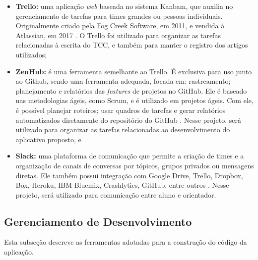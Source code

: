 \begin{itemize}

    \item \textbf{Trello: }uma aplicação \emph{web} baseada no sistema Kanbam, que auxilia no 
	gerenciamento de tarefas para times grandes ou pessoas individuais. 
	Originalmente criado pela Fog Creek Software, em 2011, e vendida à Atlassian, em 
	2017 \cite{trello2011}. O Trello foi utilizado para organizar as tarefas 
	relacionadas à escrita do TCC, e também para manter o registro dos artigos utilizados;
    \item \textbf{ZenHub: }é uma ferramenta semelhante ao Trello. É exclusiva para uso junto ao 
	Github, sendo uma ferramenta adequada, focada em: rastreamento; planejamento e 
	relatórios das \emph{features} de projetos no GitHub. Ele é baseado nas 
	metodologias ágeis, como Scrum, e é utilizado em projetos ágeis. Com ele, 
	é possível planejar roteiros; usar quadros de tarefas e gerar relatórios 
	automatizados diretamente do repositório do GitHub \cite{zenhub2020}. 
	Nesse projeto, será utilizado para organizar as tarefas relacionadas ao 
	desenvolvimento do aplicativo proposto, e
    \item \textbf{Slack: }uma plataforma de comunicação que permite a criação de times e a 
	organização de canais de conversas por tópicos, grupos privados ou mensagens 
	diretas. Ele também possui integração com  Google Drive, Trello, Dropbox, Box, 
	Heroku, IBM Bluemix, Crashlytics, GitHub, entre outros \cite{slack2013}. Nesse 
	projeto, será utilizado para comunicação entre aluno e orientador.

\end{itemize}


\subsection{Gerenciamento de Desenvolvimento}

Esta subseção descreve as ferramentas adotadas para a construção do código da aplicação.

